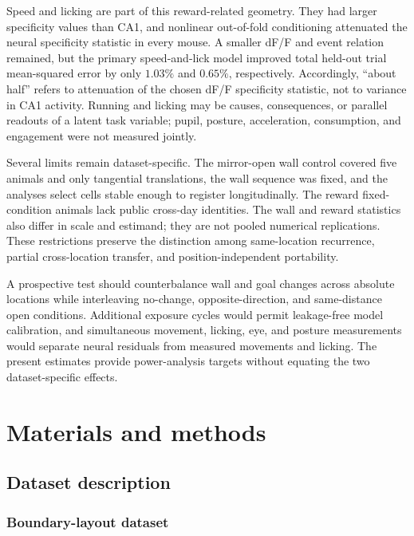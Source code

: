 \documentclass[10pt,twocolumn]{article}
\begin{document}
Speed and licking are part of this reward-related geometry. They had larger
specificity values than CA1, and nonlinear out-of-fold conditioning attenuated
the neural specificity statistic in every mouse. A smaller dF/F and event
relation remained, but the primary speed-and-lick model improved total held-out trial
mean-squared error by only $1.03\%$ and $0.65\%$, respectively. Accordingly,
``about half'' refers to attenuation of the chosen dF/F specificity statistic,
not to variance in CA1 activity. Running and licking may be causes,
consequences, or parallel readouts of a latent task variable; pupil, posture,
acceleration, consumption, and engagement were not measured jointly.

Several limits remain dataset-specific. The mirror-open wall control covered
five animals and only tangential translations, the wall sequence was fixed, and
the analyses select cells stable enough to register longitudinally. The reward
fixed-condition animals lack public cross-day identities. The wall and reward
statistics also differ in scale and estimand; they are not pooled numerical
replications. These restrictions preserve the distinction among same-location
recurrence, partial cross-location transfer, and position-independent
portability.

A prospective test should counterbalance wall and goal changes across absolute
locations while interleaving no-change, opposite-direction, and same-distance
open conditions. Additional exposure cycles would permit leakage-free model
calibration, and simultaneous movement, licking, eye, and posture measurements
would separate neural residuals from measured movements and licking. The present estimates
provide power-analysis targets without equating the two dataset-specific
effects.

\section{Materials and methods}

\subsection{Dataset description}

\subsubsection{Boundary-layout dataset}
\end{document}
